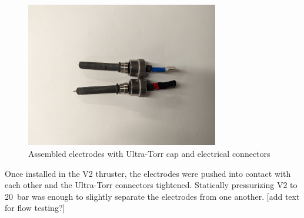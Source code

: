                 \begin{figure}[h]
                    \centering
                    \includegraphics[width=0.75\textwidth]{assets/3 design/V2 electrodes.jpg}
                    \caption{Assembled electrodes with Ultra-Torr cap and electrical connectors}
                    \label{fig:Assembled electrode}
                \end{figure}

                Once installed in the V2 thruster, the electrodes were pushed into contact with each other and the Ultra-Torr connectors tightened. Statically pressurizing V2 to \qty{20}{bar} was enough to slightly separate the electrodes from one another. [add text for flow testing?]